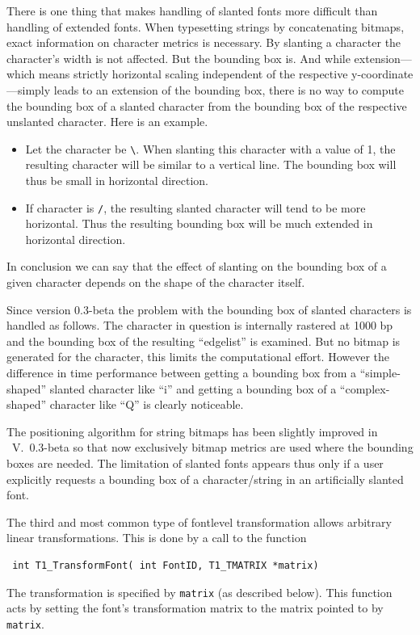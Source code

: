 There is one thing that makes handling of slanted fonts more difficult than
handling of extended fonts. When
typesetting strings by concatenating bitmaps, exact information on character
metrics is necessary. By slanting a character the character's width is not
affected. But the bounding box is. And while extension---which means 
strictly horizontal scaling independent of the respective
y-coordinate---simply leads to an extension of the bounding box, there is no
way to compute the
bounding box of a slanted character from the bounding box of the respective
unslanted character. Here is an example.
\begin{itemize}
\item Let the character be \verb+\+. When slanting this character with a
  value of 1, the resulting character will be similar to a vertical line. The
  bounding box will thus be small in horizontal direction.
\item If character is \verb+/+, the resulting slanted
  character will tend to be more horizontal. Thus the resulting bounding box
  will be much extended in horizontal direction.
\end{itemize}
In conclusion
we can say that the effect of slanting on the bounding box of
a given character depends on the shape of the character itself. 

Since version 0.3-beta the problem with the bounding box of slanted characters
is handled as follows. The character in question is internally rastered at
1000 bp and the bounding box of the resulting ``edgelist'' is examined. But no
bitmap is generated for the character, this limits the computational effort.
However the difference in time performance between getting a bounding box from
a ``simple-shaped'' slanted character like ``i'' and getting a bounding box of
a ``complex-shaped'' character like ``Q'' is clearly noticeable.

The positioning algorithm for string bitmaps has been slightly improved in
\tonelib\ V.\ 0.3-beta so that now exclusively bitmap metrics are used where 
the bounding boxes are needed. The limitation of slanted fonts appears thus
only if a user explicitly requests a bounding box of a character/string in an
artificially slanted font.

The third and most common type of fontlevel transformation allows arbitrary
linear transformations. This is done by a call to the function 
\precorr
\begin{verbatim}
 int T1_TransformFont( int FontID, T1_TMATRIX *matrix)
\end{verbatim}
\postcorr
The transformation is specified by \verb+matrix+ (as described below).
This function acts by setting the font's transformation matrix to the
matrix pointed to by \verb+matrix+.

